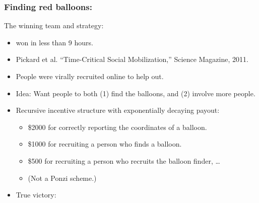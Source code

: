 \begin{frame}
  \frametitle{Finding red balloons:}

  \begin{block}{The winning team and strategy:}
    \begin{itemize}
    \item<+-> 
      won in less than 9 hours.\cite{pickard2011a}
    \item<+-> 
      Pickard et al. ``Time-Critical Social Mobilization,''\cite{pickard2011a}
      Science Magazine, 2011.
    \item<+-> 
      People were virally recruited online to help out.
    \item<+-> 
      Idea: Want people to both
      (1) find the balloons, and
      (2) involve more people.
    \item<+-> 
      Recursive incentive structure with exponentially decaying payout: 
      \begin{itemize}
      \item<+->
        \$2000 for correctly reporting
        the coordinates of a balloon.
      \item<+-> 
        \$1000 for recruiting a person who finds a balloon.
      \item<+-> 
        \$500 for recruiting a person who recruits the balloon finder, \ldots
      \item<+-> 
        (Not a Ponzi scheme.)
      \end{itemize}
    \item<+->
      True victory: 
    \end{itemize}
  \end{block}

  
\end{frame}

